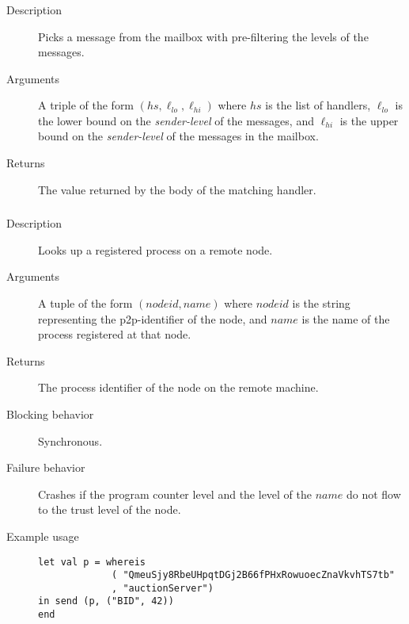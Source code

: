 \subsubsection{}
\begin{description}
    \item [Description] Picks a message from the mailbox with pre-filtering the levels of the messages.
    \item [Arguments] A triple of the form $(\mathit{hs}, \ell_{\mathit{lo}}, \ell_{\mathit{hi}}) $ where $\mathit{hs}$ is the list of handlers, $\ell_{\mathit{lo}}$ is the lower bound on the \emph{sender-level} of the messages, and 
$\ell_{\mathit{hi}}$ is the upper bound on the \emph{sender-level} of the messages in the mailbox.
    \item [Returns] The value returned by the body of the matching handler.
\end{description}

\subsubsection{}

\begin{description}
    \item [Description] Looks up a registered process on a remote node.
    \item [Arguments] A tuple of the form $(\mathit{nodeid}, \mathit{name})$ where $\mathit{nodeid}$ is the string representing the p2p-identifier of the node, and $\mathit{name}$ is the name of the process registered at that node.
    \item [Returns] The process identifier of the node on the remote machine. 
    \item [Blocking behavior] Synchronous. 
    \item [Failure behavior] Crashes if the program counter level and the level of the $\mathit{name}$ do not flow to the trust level of the node.
    \item [Example usage]
\begin{minipage}[t]{30em}
\begin{verbatim}
let val p = whereis 
             ( "QmeuSjy8RbeUHpqtDGj2B66fPHxRowuoecZnaVkvhTS7tb"
             , "auctionServer")
in send (p, ("BID", 42))
end
\end{verbatim}    
\end{minipage}
\end{description}


\clearpage
